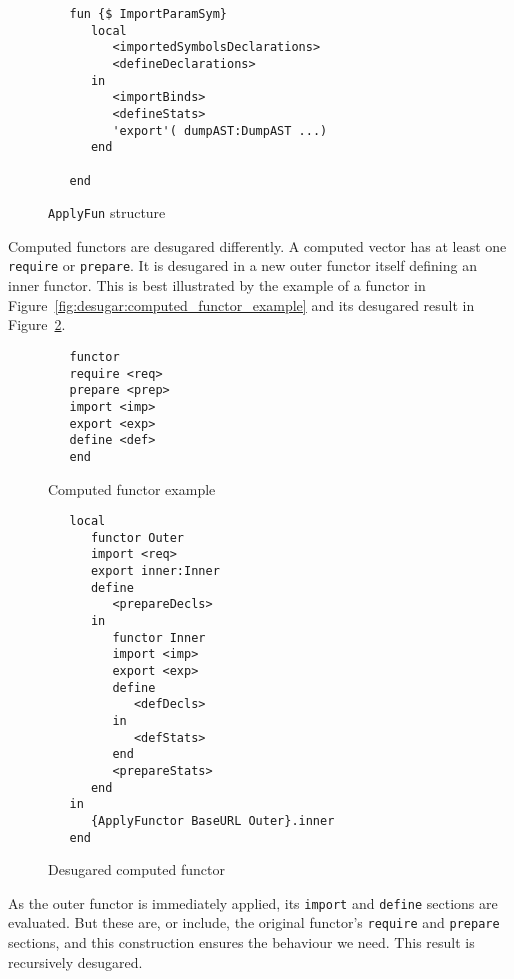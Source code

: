 \documentclass[a4paper]{memoir}
\begin{document}
\begin{figure}[h]
\begin{lstlisting}
   fun {$ ImportParamSym}
      local
         <importedSymbolsDeclarations>
         <defineDeclarations>
      in
         <importBinds>
         <defineStats>
         'export'( dumpAST:DumpAST ...)
      end
   
   end
\end{lstlisting}
\caption{\lstinline!ApplyFun! structure}
\label{fig:desugar:apply_fun}
\end{figure}


Computed functors are desugared differently. A computed vector has at least one
\lstinline!require! or \lstinline!prepare!. It is desugared in a new outer
functor itself defining an inner functor.  This is best illustrated by the
example of a functor in Figure~\ref{fig:desugar:computed_functor_example} and
its desugared result in
Figure~\ref{fig:desugar:desugared_computed_functor_example}.

\begin{figure}[ht]
\begin{lstlisting}
   functor
   require <req>
   prepare <prep>
   import <imp>
   export <exp>
   define <def>
   end
\end{lstlisting}
\caption{Computed functor example}
\label{fig:desugar:computed_functor_example}

\begin{lstlisting}
   local
      functor Outer
      import <req>
      export inner:Inner
      define
         <prepareDecls>
      in
         functor Inner
         import <imp>
         export <exp>
         define
            <defDecls>
         in
            <defStats>
         end
         <prepareStats>
      end
   in
      {ApplyFunctor BaseURL Outer}.inner
   end
\end{lstlisting}
\caption{Desugared computed functor}
\label{fig:desugar:desugared_computed_functor_example}
\end{figure}

As the outer functor is immediately applied, its \lstinline!import! and \lstinline!define! sections are evaluated.
But these are, or include, the original functor's \lstinline!require! and \lstinline!prepare! sections, and this
construction ensures the behaviour we need.
This result is recursively desugared.
\end{document}
